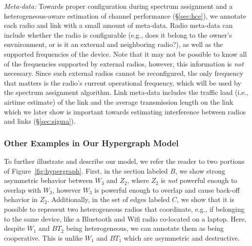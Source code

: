 \smallskip
\emph{Meta-data:}  Towards proper configuration during spectrum assignment and a heterogeneous-aware estimation of channel performance (\S\ref{sec:hce}), we annotate each radio and link with a small amount of meta-data.  Radio meta-data can include whether the radio is configurable (e.g., does it belong to the owner's envnironment, or is it an external and neighboring radio?), as well as the supported frequencies of the device.  Note that it may not be possible to know all of the frequencies supported by external radios, however, this information is \emph{not} necessary.  Since such external radios cannot be reconfigured, the only frequency that matters is the radio's current operational frequency, which will be used by the spectrum assignment algorithm.  Link meta-data includes the traffic load (i.e., airtime estimate) of the link and the average transmission length on the link which we later show is important towards estimating interference between radios and links (\S\ref{sec:sigma}).  


\smallskip
\subsubsection{Other Examples in Our Hypergraph Model}  
\label{sec:hyperex}

To further illustrate and describe our model, we refer the reader to two portions of Figure~\ref{fig:hypergraph}.  First, in the section labeled $B$, we show strong asymmetric behavior between $W_3$ and $Z_2$, where $Z_2$ is \emph{not} powerful enough to overlap with $W_3$, however $W_3$ is powerful enough to overlap and cause back-off behavior in $Z_2$.  Additionally, in the set of edges labeled $C$, we show that it is possible to represent two heterogeneous radios that coordinate, e.g., if belonging to the same device, like a Bluetooth and Wifi radio co-located on a laptop.  Here, despite $W_1$ and $BT_2$ being heterogeneous, we can annotate them as being cooperative.  This is unlike $W_1$ and $BT_1$ which are asymmetric and destructive.  
